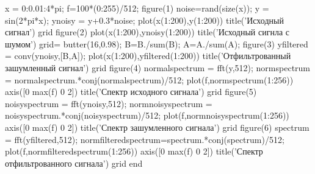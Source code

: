 \documentclass[10pt,a4paper]{report}
\begin{document}
x = 0:0.01:4*pi;\newline
f=100*(0:255)/512;\newline
figure(1)\newline
noise=rand(size(x));\newline
y = sin(2*pi*x);\newline
ynoisy = y+0.3*noise;\newline
plot(x(1:200),y(1:200))\newline
title('Исходный сигнал')\newline
grid\newline
figure(2)\newline
plot(x(1:200),ynoisy(1:200))\newline
title('Исходный сигнла с шумом')\newline
grid\newline
[B,A] = butter(16,0.98); %
B=B./sum(B);\newline
A=A./sum(A);\newline
figure(3)\newline
yfiltered = conv(ynoisy,[B,A]);\newline
plot(x(1:200),yfiltered(1:200))\newline
title('Отфильтрованный зашумленный сигнал')\newline
grid\newline
figure(4)\newline
normalspectrum = fft(y,512);\newline
normspectrum = normalspectrum.*conj(normalspectrum)/512;\newline
plot(f,normspectrum(1:256))\newline
axis([0 max(f) 0 2])\newline
title('Спектр исходного сигнала')\newline
grid\newline
figure(5)\newline
noisyspectrum = fft(ynoisy,512);\newline
normnoisyspectrum = noisyspectrum.*conj(noisyspectrum)/512;\newline
plot(f,normnoisyspectrum(1:256))\newline
axis([0 max(f) 0 2])\newline
title('Спектр зашумленного сигнала')\newline
grid\newline
figure(6)\newline
spectrum = fft(yfiltered,512);\newline
normfilteredspectrum=spectrum.*conj(spectrum)/512;\newline
plot(f,normfilteredspectrum(1:256))\newline
axis([0 max(f) 0 2])\newline
title('Спектр отфильтрованного сигнала')\newline
grid\newline
end\newline
\end{document}
